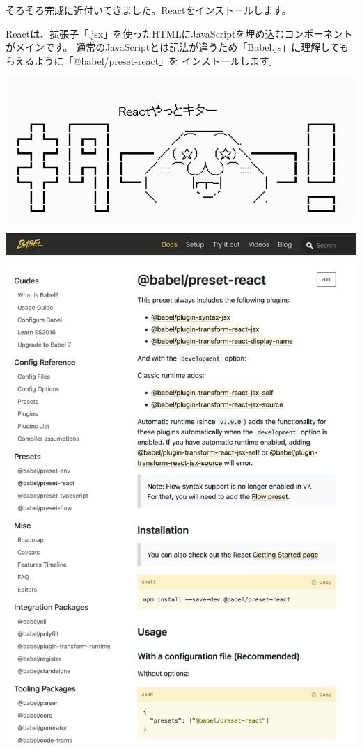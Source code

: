 そろそろ完成に近付いてきました。Reactをインストールします。

\vspace*{\baselineskip}

Reactは、拡張子「.jsx」を使ったHTMLにJavaScriptを埋め込むコンポーネントがメインです。
通常のJavaScriptとは記法が違うため「Babel.js」に理解してもらえるように「@babel/preset{-}react」を
インストールします。

\begin{reviewimage}[H]%
\includegraphics[width=0.8\maxwidth]{./images/02-create-react-app/react-kita.png}%
\label{image:02-create-react-app:react-kita}
\end{reviewimage}
\begin{reviewimage}%
\includegraphics[width=0.9\maxwidth]{./images/02-create-react-app/babel08.png}%
\label{image:02-create-react-app:babel08}
\end{reviewimage}

